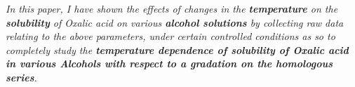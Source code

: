 \textit{In this paper, I have shown the effects of changes in the \textbf{temperature} on the \textbf{solubility} of Oxalic acid on various \textbf{alcohol solutions} by collecting raw data relating to the above parameters, under certain controlled conditions as so to completely study the \textbf{temperature dependence of solubility of Oxalic acid in various Alcohols with respect to a gradation on the homologous series}.}



